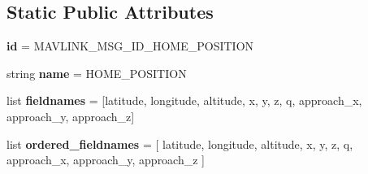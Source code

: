\subsection*{Static Public Attributes}
\begin{DoxyCompactItemize}
\item 
\mbox{\label{classpymavlink_1_1dialects_1_1v10_1_1MAVLink__home__position__message_a368cf22b0243613ede0b7e01797eb844}} 
{\bfseries id} = M\+A\+V\+L\+I\+N\+K\+\_\+\+M\+S\+G\+\_\+\+I\+D\+\_\+\+H\+O\+M\+E\+\_\+\+P\+O\+S\+I\+T\+I\+ON
\item 
\mbox{\label{classpymavlink_1_1dialects_1_1v10_1_1MAVLink__home__position__message_a6672b857259a2a235c004b8ef81dd7b0}} 
string {\bfseries name} = \textquotesingle{}H\+O\+M\+E\+\_\+\+P\+O\+S\+I\+T\+I\+ON\textquotesingle{}
\item 
\mbox{\label{classpymavlink_1_1dialects_1_1v10_1_1MAVLink__home__position__message_a4b5d96eeb8b5cc4693d02e06a7569aa2}} 
list {\bfseries fieldnames} = \mbox{[}\textquotesingle{}latitude\textquotesingle{}, \textquotesingle{}longitude\textquotesingle{}, \textquotesingle{}altitude\textquotesingle{}, \textquotesingle{}x\textquotesingle{}, \textquotesingle{}y\textquotesingle{}, \textquotesingle{}z\textquotesingle{}, \textquotesingle{}q\textquotesingle{}, \textquotesingle{}approach\+\_\+x\textquotesingle{}, \textquotesingle{}approach\+\_\+y\textquotesingle{}, \textquotesingle{}approach\+\_\+z\textquotesingle{}\mbox{]}
\item 
\mbox{\label{classpymavlink_1_1dialects_1_1v10_1_1MAVLink__home__position__message_a0706b1032c4f8fbc79fad9b69e4104a4}} 
list {\bfseries ordered\+\_\+fieldnames} = \mbox{[} \textquotesingle{}latitude\textquotesingle{}, \textquotesingle{}longitude\textquotesingle{}, \textquotesingle{}altitude\textquotesingle{}, \textquotesingle{}x\textquotesingle{}, \textquotesingle{}y\textquotesingle{}, \textquotesingle{}z\textquotesingle{}, \textquotesingle{}q\textquotesingle{}, \textquotesingle{}approach\+\_\+x\textquotesingle{}, \textquotesingle{}approach\+\_\+y\textquotesingle{}, \textquotesingle{}approach\+\_\+z\textquotesingle{} \mbox{]}

\end{DoxyCompactItemize}
